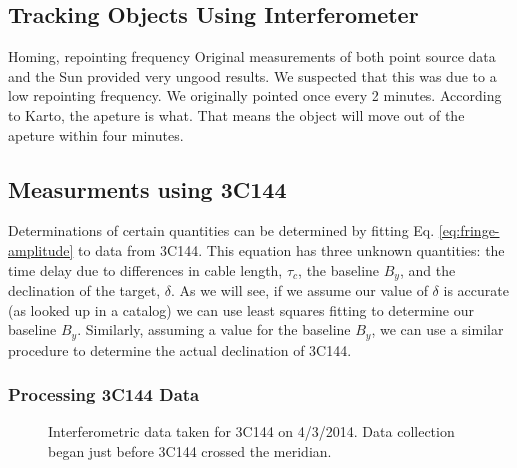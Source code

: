 \documentclass[12pt]{article}
\begin{document}
\subsection{Tracking Objects Using Interferometer}
Homing, repointing frequency
Original measurements of both point source data and the Sun provided very ungood results. We suspected that this was due to a low repointing frequency. We originally pointed once every 2 minutes. According to Karto, the apeture is what. That means the object will move out of the apeture within four minutes. 



\subsection{Measurments using 3C144}
Determinations of certain quantities can be determined by fitting Eq. \ref{eq:fringe-amplitude} to data from 3C144. This equation has three unknown quantities: the time delay due to differences in cable length, $\tau_c$, the baseline $B_y$, and the declination of the target, $\delta$. As we will see, if we assume our value of $\delta$ is accurate (as looked up in a catalog) we can use least squares fitting to determine our baseline $B_y$. Similarly, assuming a value for the baseline $B_y$, we can use a similar procedure to determine the actual declination of 3C144.

\subsubsection{Processing 3C144 Data}

\begin{figure}[H]
\caption[SODUMB]{Interferometric data taken for 3C144 on 4/3/2014. Data collection began just before 3C144 crossed the meridian.}
\label{fig:original}
\end{figure}
\end{document}
